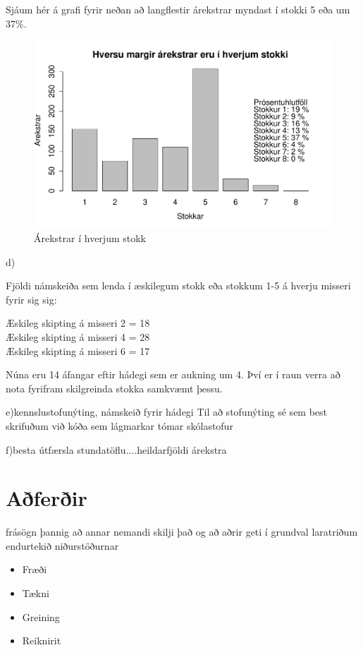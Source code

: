 \documentclass[a4paper,12pt]{article}
\begin{document}
Sjáum hér á grafi fyrir neðan að langflestir árekstrar myndast í stokki 5 eða um 37$\%$. 


\begin{figure}[ht!]
\centering
\includegraphics[width=120mm]{c_lidur_plot}
\caption{Árekstrar í hverjum stokk}
\label{fig: arekstrar}
\end{figure}



d)

Fjöldi námskeiða sem lenda í æskilegum stokk eða stokkum 1-5 á hverju misseri fyrir sig sig:

Æskileg skipting á misseri 2 = 18\\
Æskileg skipting á misseri 4 = 28\\
Æskileg skipting á misseri 6 = 17

Núna eru 14 áfangar eftir hádegi sem er aukning um 4. Því er í raun verra að nota fyrifram skilgreinda stokka samkvæmt þessu.

e)kennslustofunýting, námskeið fyrir hádegi
Til að stofunýting sé sem best skrifuðum við kóða sem lágmarkar tómar skólastofur

f)besta útfærsla stundatöflu....heildarfjöldi árekstra

\section{Aðferðir}
frásögn þannig að annar nemandi skilji það og að aðrir geti í
grundval laratriðum endurtekið niðurstöðurnar
\begin{itemize}
\item Fræði
\item Tækni
\item Greining
\item Reiknirit
\end{itemize}
\end{document}
